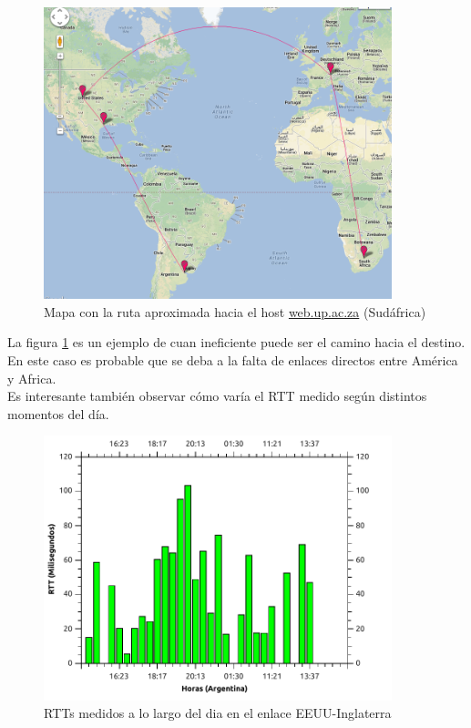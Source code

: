 \begin{figure}[H]
  \centering
    \includegraphics[width=0.9\textwidth]{imgs/sudafrica_ruta_1.png}
    \caption{Mapa con la ruta aproximada hacia el host \url{web.up.ac.za} (Sud\'africa)}
    \label{fig:ruta_sud}
\end{figure}

La figura \ref{fig:ruta_sud} es un ejemplo de cuan ineficiente puede ser el camino hacia el destino. En este caso es probable que se deba a la falta de enlaces directos entre América y Africa.\\

Es interesante tambi\'en observar c\'omo var\'ia el RTT medido seg\'un distintos momentos del d\'ia.

\begin{figure}[H]
  \centering
    \includegraphics[width=0.9\textwidth]{graficos/rtts_dia_finlandia.pdf}
    \caption{RTTs medidos a lo largo del dia en el enlace EEUU-Inglaterra}
    \label{fig:rtts_fin}
\end{figure}

